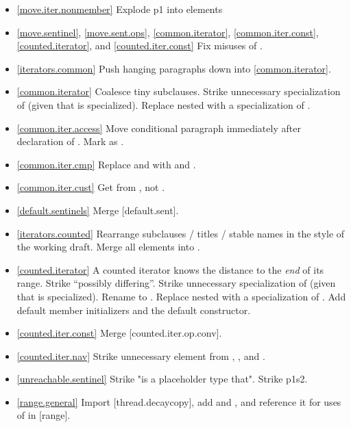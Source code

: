 \begin{itemize}
\item \ref{move.iter.nonmember} Explode p1 into \constraints elements
\item \ref{move.sentinel}, \ref{move.sent.ops}, \ref{common.iterator},
  \ref{common.iter.const}, \ref{counted.iterator},
  and \ref{counted.iter.const} Fix misuses of .
\item \ref{iterators.common} Push hanging paragraphs down
  into \ref{common.iterator}.
\item \ref{common.iterator} Coalesce tiny subclauses. Strike unnecessary
  specialization of  (given that 
  is specialized). Replace nested  with a specialization
  of .
\item \ref{common.iter.access} Move conditional  paragraph
  immediately after declaration of .
  Mark  as .
\item \ref{common.iter.cmp} Replace  and  with
   and .
\item \ref{common.iter.cust} Get  from , not .
\item \ref{default.sentinels} Merge [default.sent].
\item \ref{iterators.counted} Rearrange subclauses / titles / stable names
  in the style of the working draft. Merge all \returns elements into \effects.
\item \ref{counted.iterator} A counted iterator knows the distance to the
  \textit{end} of its range. Strike ``possibly differing''.
  Strike unnecessary specialization of 
  (given that  is specialized).
  Rename  to . Replace nested 
  with a specialization of .
  Add default member initializers and  the default constructor.
\item \ref{counted.iter.const} Merge [counted.iter.op.conv].
\item \ref{counted.iter.nav} Strike unnecessary \expects element from
  , , and
  .
\item \ref{unreachable.sentinel} Strike "is a placeholder type that".
  Strike p1s2.
\item \ref{range.general} Import [thread.decaycopy], add  and
  , and reference it for uses of  in [range].

\end{itemize}

